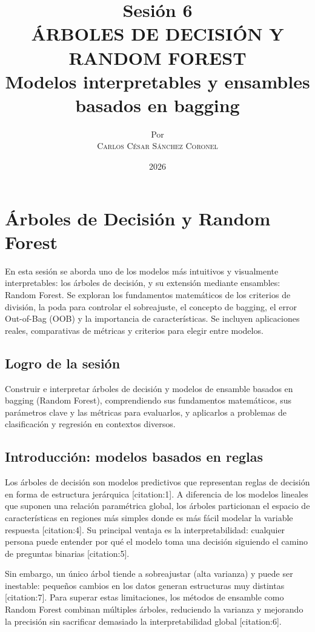 \documentclass[12pt,a4paper,openany,oneside]{book}
\title{
    \textbf{Sesión 6} \\ 
    \Huge \textbf{ÁRBOLES DE DECISIÓN Y RANDOM FOREST} \\
    \Large Modelos interpretables y ensambles basados en bagging
}
\author{
    \small Por \\ \vspace{0.2cm}
    \Large \textsc{Carlos César Sánchez Coronel}
}
\date{2026}
\begin{document}
\maketitle
\tableofcontents
{}

\chapter{Árboles de Decisión y Random Forest}

En esta sesión se aborda uno de los modelos más intuitivos y visualmente interpretables: los árboles de decisión, y su extensión mediante ensambles: Random Forest. Se exploran los fundamentos matemáticos de los criterios de división, la poda para controlar el sobreajuste, el concepto de bagging, el error Out-of-Bag (OOB) y la importancia de características. Se incluyen aplicaciones reales, comparativas de métricas y criterios para elegir entre modelos.

\section{Logro de la sesión}
Construir e interpretar árboles de decisión y modelos de ensamble basados en bagging (Random Forest), comprendiendo sus fundamentos matemáticos, sus parámetros clave y las métricas para evaluarlos, y aplicarlos a problemas de clasificación y regresión en contextos diversos.

\section{Introducción: modelos basados en reglas}
Los árboles de decisión son modelos predictivos que representan reglas de decisión en forma de estructura jerárquica [citation:1]. A diferencia de los modelos lineales que suponen una relación paramétrica global, los árboles particionan el espacio de características en regiones más simples donde es más fácil modelar la variable respuesta [citation:4]. Su principal ventaja es la interpretabilidad: cualquier persona puede entender por qué el modelo toma una decisión siguiendo el camino de preguntas binarias [citation:5].

Sin embargo, un único árbol tiende a sobreajustar (alta varianza) y puede ser inestable: pequeños cambios en los datos generan estructuras muy distintas [citation:7]. Para superar estas limitaciones, los métodos de ensamble como Random Forest combinan múltiples árboles, reduciendo la varianza y mejorando la precisión sin sacrificar demasiado la interpretabilidad global [citation:6].
\end{document}
